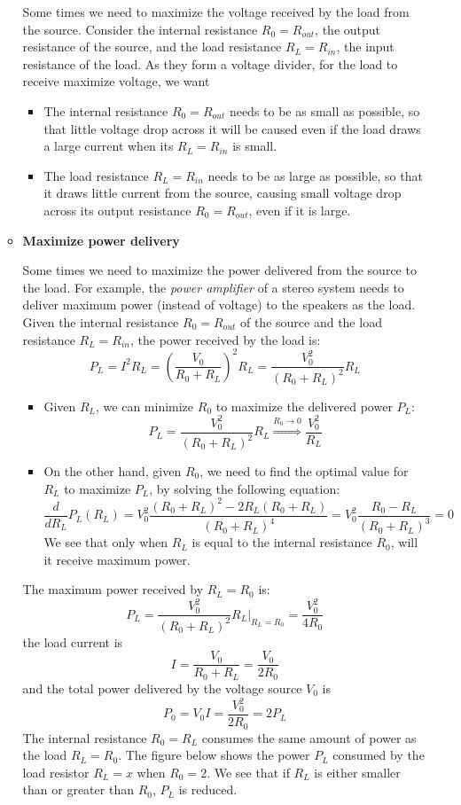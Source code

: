 \begin{itemize}
\begin{itemize}
  Some times we need to maximize the voltage received by the load from 
  the source. Consider the internal resistance $R_0=R_{out}$, the output 
  resistance of the source, and the load resistance $R_L=R_{in}$, the 
  input resistance of the load. As they form a voltage divider, for the
  load to receive maximize voltage, we want 
  \begin{itemize}
  \item The internal resistance $R_0=R_{out}$ needs to be as small as
    possible, so that little voltage drop across it will be caused even 
    if the load draws a large current when its $R_L=R_{in}$ is small.
  \item The load resistance $R_L=R_{in}$ needs to be as large as possible, 
    so that it draws little current from the source, causing small voltage
    drop across its output resistance $R_0=R_{out}$, even if it is large.
  \end{itemize}
  
\item {\bf Maximize power delivery}

  Some times we need to maximize the power delivered from the source to 
  the load. For example, the {\em power amplifier} of a stereo system 
  needs to deliver maximum power (instead of voltage) to the speakers as 
  the load. Given the internal resistance $R_0=R_{out}$ of the source and
  the load resistance $R_L=R_{in}$, the power received by the load is:
  \[
  P_L=I^2 R_L=\left(\frac{V_0}{R_0+R_L}\right)^2 R_L	
  =\frac{V_0^2}{(R_0+R_L)^2} R_L	
  \]
  \begin{itemize}
  \item Given $R_L$, we can minimize $R_0$ to maximize the delivered
    power $P_L$:  
    \[
    P_L=\frac{V_0^2}{(R_0+R_L)^2} R_L \stackrel{R_0\rightarrow 0}{\Longrightarrow}
    \frac{V_0^2}{R_L}
    \]
  \item On the other hand, given $R_0$, we need to find the optimal value 
    for $R_L$ to maximize $P_L$, by solving the following equation:
    \[
    \frac{d}{dR_L} P_L(R_L)
    =V_0^2\frac{(R_0+R_L)^2-2R_L(R_0+R_L)}{(R_0+R_L)^4}	
    =V_0^2\frac{R_0-R_L}{(R_0+R_L)^3}=0
    \]
    We see that only when $R_L$ is equal to the internal resistance $R_0$,
    will it receive maximum power.
  \end{itemize}

  The maximum power received by $R_L=R_0$ is:
  \[
  P_L=\frac{V_0^2}{(R_0+R_L)^2} R_L\bigg|_{R_L=R_0}=\frac{V_0^2}{4R_0} 
  \]
  the load current is 
  \[
  I=\frac{V_0}{R_0+R_L}=\frac{V_0}{2R_0}
  \]
  and the total power delivered by the voltage source $V_0$ is 
  \[
  P_0=V_0 I=\frac{V_0^2}{2R_0}=2P_L 
  \]
  The internal resistance $R_0=R_L$ consumes the same amount of power 
  as the load $R_L=R_0$. The figure below shows the power $P_L$ consumed 
  by the load resistor $R_L=x$ when $R_0=2$. We see that if $R_L$ is 
  either smaller than or greater than $R_0$, $P_L$ is reduced.


\end{itemize}
\end{itemize}
